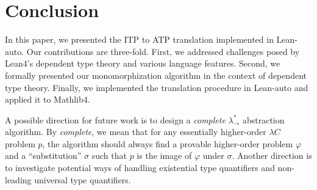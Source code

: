 \section{Conclusion}

In this paper, we presented the ITP to ATP translation implemented in Lean-auto.
Our contributions are three-fold. First, we addressed challenges posed by
Lean4's dependent type theory and various language features. Second, we formally
presented our monomorphization algorithm in the context of dependent type theory.
Finally, we implemented the translation procedure in Lean-auto and applied it to Mathlib4.

A possible direction for future work is to design a \textit{complete} $\lambda_\to^*$
abstraction algorithm. By \textit{complete}, we mean that for any essentially
higher-order $\lambda C$ problem $p$, the algorithm should always find a provable
higher-order problem $\varphi$ and a ``substitution'' $\sigma$ such that $p$
is the image of $\varphi$ under $\sigma$. Another direction is to investigate
potential ways of handling existential type quantifiers and non-leading universal
type quantifiers.